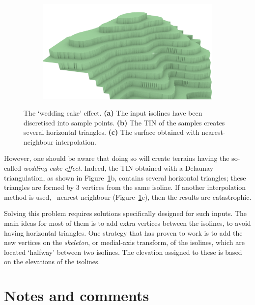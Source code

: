 \begin{figure}
\begin{subfigure}[b]{0.33\linewidth}
    \caption{}
  \end{subfigure}
  \begin{subfigure}[b]{0.33\linewidth}
    \centering
    \includegraphics[width=\textwidth]{figs/wedding-nn.png}
    \caption{}
  \end{subfigure}  
\caption{The `wedding cake' effect. \textbf{(a)} The input isolines have been discretised into sample points. \textbf{(b)} The TIN of the samples creates several horizontal triangles. \textbf{(c)} The surface obtained with nearest-neighbour interpolation.}%
\label{fig:wedding}
\end{figure}
However, one should be aware that doing so will create terrains having the so-called \emph{wedding cake effect}.
Indeed, the TIN obtained with a Delaunay triangulation, as shown in Figure~\ref{fig:wedding}b, contains several horizontal triangles; these triangles are formed by 3 vertices from the same isoline.
If another interpolation method is used, \eg\ nearest neighbour (Figure~\ref{fig:wedding}c), then the results are catastrophic.

%

Solving this problem requires solutions specifically designed for such inputs.
The main ideas for most of them is to add extra vertices between the isolines, to avoid having horizontal triangles. 
One strategy that has proven to work is to add the new vertices on the \emph{skeleton}, or medial-axis transform, of the isolines, which are located `halfway' between two isolines.
The elevation assigned to these is based on the elevations of the isolines.


%
\section{Notes and comments}

